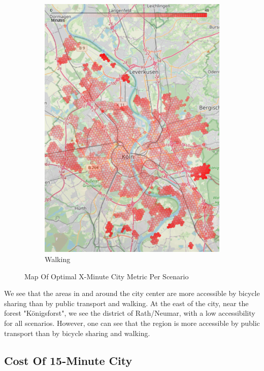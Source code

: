 \begin{figure}
\begin{subfigure}[b]{0.3\textwidth}
         \includegraphics[width=\textwidth]{Figures/results/minute_city_metric/walking_optimal_map}
         \caption{Walking}
         \label{fig:walking_optimal_map}
     \end{subfigure}
        \caption{Map Of Optimal X-Minute City Metric Per Scenario}
        \label{fig:optimal_map_per_scenario}
\end{figure}
We see that the areas in and around the city center are more accessible by bicycle sharing than by public transport and walking.
At the east of the city, near the forest "Königsforst", we see the district of Rath/Neumar, with a low accessibility for all scenarios.
However, one can see that the region is more accessible by public transport than by bicycle sharing and walking.

\subsection{Cost Of 15-Minute City}
\label{subsec:cost_of_15_minute_city}

